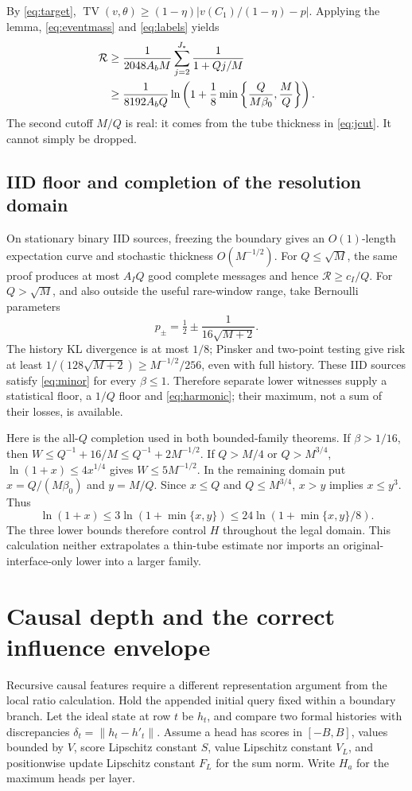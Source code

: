 \documentclass[11pt,letterpaper]{article}
\theoremstyle{definition}\newtheorem{definition}[theorem]{Definition}
\theoremstyle{remark}\newtheorem{remark}[theorem]{Remark}
\newcommand{\TV}{\operatorname{TV}}
\newcommand{\betaz}{\beta_0}
\newcommand{\Risk}{\mathcal{R}}
\begin{document}
By \eqref{eq:target}, $\TV(v,\theta)\ge(1-\eta)|v(C_1)/(1-\eta)-p|$. Applying the lemma, \eqref{eq:eventmass} and \eqref{eq:labels} yields
\begin{align}\label{eq:harmonic}
 \Risk&\ge\frac1{2048A_bM}\sum_{j=2}^{J_*}\frac1{1+Qj/M}\notag\\
 &\ge\frac1{8192A_bQ}\ln\left(1+\frac18\min\left\{\frac{Q}{M\betaz},\frac M Q\right\}\right).
\end{align}
The second cutoff $M/Q$ is real: it comes from the tube thickness in \eqref{eq:jcut}. It cannot simply be dropped.

\subsection{IID floor and completion of the resolution domain}\label{sec:completion}
On stationary binary IID sources, freezing the boundary gives an $O(1)$-length expectation curve and stochastic thickness $O(M^{-1/2})$. For $Q\le\sqrt M$, the same proof produces at most $A_IQ$ good complete messages and hence $\Risk\ge c_I/Q$. For $Q>\sqrt M$, and also outside the useful rare-window range, take Bernoulli parameters
\[
 p_\pm=\tfrac12\pm\frac1{16\sqrt{M+2}}.
\]
The history KL divergence is at most $1/8$; Pinsker and two-point testing give risk at least $1/(128\sqrt{M+2})\ge M^{-1/2}/256$, even with full history. These IID sources satisfy \eqref{eq:minor} for every $\beta\le1$. Therefore separate lower witnesses supply a statistical floor, a $1/Q$ floor and \eqref{eq:harmonic}; their maximum, not a sum of their losses, is available.

Here is the all-$Q$ completion used in both bounded-family theorems. If $\beta>1/16$, then $W\le Q^{-1}+16/M\le Q^{-1}+2M^{-1/2}$. If $Q>M/4$ or $Q>M^{3/4}$, $\ln(1+x)\le4x^{1/4}$ gives $W\le5M^{-1/2}$. In the remaining domain put $x=Q/(M\betaz)$ and $y=M/Q$. Since $x\le Q$ and $Q\le M^{3/4}$, $x>y$ implies $x\le y^3$. Thus
\[
 \ln(1+x)\le3\ln(1+\min\{x,y\})
 \le24\ln(1+\min\{x,y\}/8).
\]
The three lower bounds therefore control $H$ throughout the legal domain. This calculation neither extrapolates a thin-tube estimate nor imports an original-interface-only lower into a larger family.

\section{Causal depth and the correct influence envelope}\label{sec:causal}
Recursive causal features require a different representation argument from the local ratio calculation. Hold the appended initial query fixed within a boundary branch. Let the ideal state at row $t$ be $h_t$, and compare two formal histories with discrepancies $\delta_t=\|h_t-h'_t\|$. Assume a head has scores in $[-B,B]$, values bounded by $V$, score Lipschitz constant $S$, value Lipschitz constant $V_L$, and positionwise update Lipschitz constant $F_L$ for the sum norm. Write $H_a$ for the maximum heads per layer.
\end{document}
